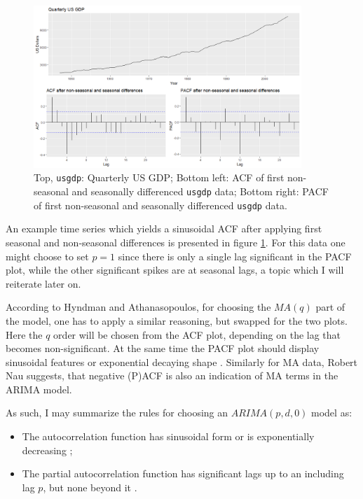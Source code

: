 \documentclass[12pt,a4paper,titlepage]{report}
\begin{document}
\begin{figure}[h]
    \centering
    \includegraphics[width=0.9\textwidth]{dusgdpacfpacf}
    \caption{Top, \texttt{usgdp}: Quarterly US GDP; Bottom left: ACF of first non-seasonal and seasonally differenced \texttt{usgdp} data; Bottom right: PACF of first non-seasonal and seasonally differenced \texttt{usgdp} data.}
    \label{usgdpacfpacf}
\end{figure}

An example time series which yields a sinusoidal ACF after applying first seasonal and non-seasonal differences is presented in figure \ref{usgdpacfpacf}. For this data one might choose to set $ p = 1 $ since there is only a single lag significant in the PACF plot, while the other significant spikes are at seasonal lags, a topic which I will reiterate later on. \cite{hyndman2008forecasting}

According to Hyndman and Athanasopoulos, for choosing the $ MA(q) $ part of the model, one has to apply a similar reasoning, but swapped for the two plots. Here the $ q $ order will be chosen from the ACF plot, depending on the lag that becomes non-significant. At the same time the PACF plot should display sinusoidal features or exponential decaying shape \cite{fpp2nonseasonalarima}. Similarly for MA data, Robert Nau suggests, that negative (P)ACF is also an indication of MA terms in the ARIMA model. \cite{nauarimaarmarules}

As such, I may summarize the rules for choosing an $ ARIMA(p, d, 0) $ model as:
\begin{itemize}
    \item The autocorrelation function has sinusoidal form or is exponentially decreasing \cite{nauarimaarmarules};
    \item The partial autocorrelation function has significant lags up to an including lag $ p $, but none beyond it \cite{fpp2nonseasonalarima} .
\end{itemize}
\end{document}
